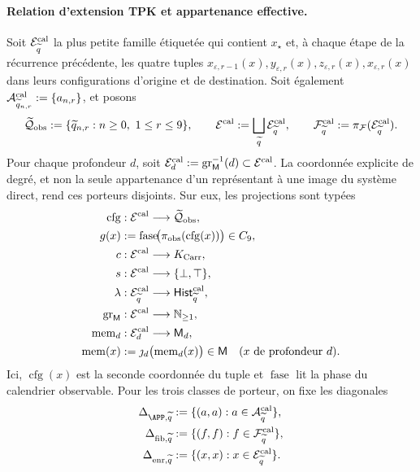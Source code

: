 \paragraph{Relation d’extension TPK et appartenance effective.}
Soit \(\mathcal E^{\rm cal}_{\widetilde q}\) la plus petite famille étiquetée qui contient
\(x_\star\) et, à chaque étape de la récurrence précédente, les quatre tuples
\(x_{\varepsilon,r-1}(x),y_{\varepsilon,r}(x),
z_{\varepsilon,r}(x),x_{\varepsilon,r}(x)\) dans leurs configurations d’origine
et de destination. Soit également
\(\mathcal A^{\rm cal}_{\widetilde q_{n,r}}:=\{a_{n,r}\}\), et posons
\[
 \widetilde{\mathcal Q}_{\rm obs}:=
   \{\widetilde q_{n,r}:n\ge0,\ 1\le r\le9\},
 \qquad
 \mathcal E^{\rm cal}:=\bigsqcup_{\widetilde q}
     \mathcal E^{\rm cal}_{\widetilde q},
 \qquad
 \mathcal F^{\rm cal}_{\widetilde q}:=
     \pi_{\mathcal F}(\mathcal E^{\rm cal}_{\widetilde q}).
\]
Pour chaque profondeur \(d\), soit
\(\mathcal E^{\rm cal}_d:=
\operatorname{gr}_{\mathsf M}^{-1}(d)\subset\mathcal E^{\rm cal}\). La
coordonnée explicite de degré, et non la seule appartenance d’un représentant à
une image du système direct, rend ces porteurs disjoints. Sur eux,
les projections sont typées
\[
\begin{aligned}
 \operatorname{cfg}&:\mathcal E^{\rm cal}\longrightarrow
     \widetilde{\mathcal Q}_{\rm obs},\\
 g(x)&:=\operatorname{fase}\!
       \bigl(\pi_{\rm obs}(\operatorname{cfg}(x))\bigr)\in C_9,\\
 c&:\mathcal E^{\rm cal}\longrightarrow K_{\rm Carr},\\
 s&:\mathcal E^{\rm cal}\longrightarrow\{\bot,\top\},\\
 \lambda&:\mathcal E^{\rm cal}_{\widetilde q}
       \longrightarrow\mathsf{Hist}^{\rm cal}_{\widetilde q},\\
 \operatorname{gr}_{\mathsf M}&:\mathcal E^{\rm cal}
       \longrightarrow\mathbb N_{\ge1},\\
 \operatorname{mem}_d&:\mathcal E^{\rm cal}_d
       \longrightarrow\mathsf M_d,\\
 \operatorname{mem}(x)&:=
       \jmath_d\bigl(\operatorname{mem}_d(x)\bigr)\in\mathsf M
       \quad(x\text{ de profondeur }d).
\end{aligned}
\]
Ici, \(\operatorname{cfg}(x)\) est la seconde coordonnée du tuple et
\(\operatorname{fase}\) lit la phase du calendrier observable. Pour les trois
classes de porteur, on fixe les diagonales
\[
\begin{aligned}
 \Delta_{\APP,\widetilde q}
   &:=\{(a,a):a\in\mathcal A^{\rm cal}_{\widetilde q}\},\\
 \Delta_{{\rm fib},\widetilde q}
   &:=\{(f,f):f\in\mathcal F^{\rm cal}_{\widetilde q}\},\\
 \Delta_{{\rm enr},\widetilde q}
   &:=\{(x,x):x\in\mathcal E^{\rm cal}_{\widetilde q}\}.
\end{aligned}
\]
